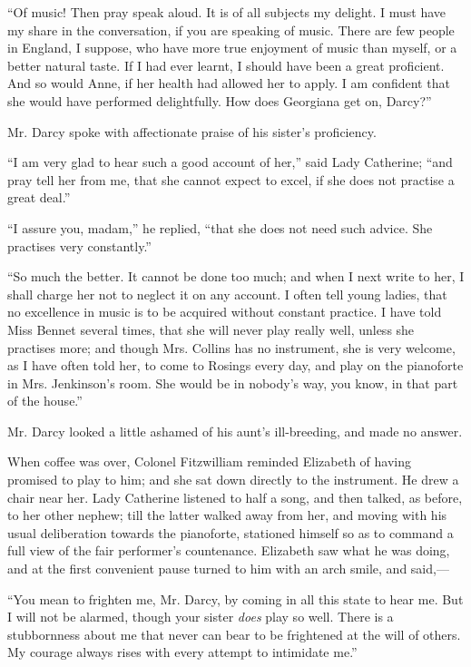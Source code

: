 \documentclass[12pt]{book}
\begin{document}
``Of music! Then pray speak aloud. It is of all subjects my delight. I must have my share in the conversation, if you are speaking of music. There are few people in England, I suppose, who have more true enjoyment of music than myself, or a better natural taste. If I had ever learnt, I should have been a great proficient. And so would Anne, if her health had allowed her to apply. I am confident that she would have performed delightfully. How does Georgiana get on, Darcy?''

Mr. Darcy spoke with affectionate praise of his sister's proficiency.

``I am very glad to hear such a good account of her,'' said Lady Catherine; ``and pray tell her from me, that she cannot expect to excel, if she does not practise a great deal.''

``I assure you, madam,'' he replied, ``that she does not need such advice. She practises very constantly.''

``So much the better. It cannot be done too much; and when I next write to her, I shall charge her not to neglect it on any account. I often tell young ladies, that no excellence in music is to be acquired without constant practice. I have told Miss Bennet several times, that she will never play really well, unless she practises more; and though Mrs. Collins has no instrument, she is very welcome, as I have often told her, to come to Rosings every day, and play on the pianoforte in Mrs. Jenkinson's room. She would be in nobody's way, you know, in that part of the house.''

Mr. Darcy looked a little ashamed of his aunt's ill-breeding, and made no answer.

When coffee was over, Colonel Fitzwilliam reminded Elizabeth of having promised to play to him; and she sat down directly to the instrument. He drew a chair near her. Lady Catherine listened to half a song, and then talked, as before, to her other nephew; till the latter walked away from her, and moving with his usual deliberation towards the pianoforte, stationed himself so as to command a full view of the fair performer's countenance. Elizabeth saw what he was doing, and at the first convenient pause turned to him with an arch smile, and said,---

``You mean to frighten me, Mr. Darcy, by coming in all this state to hear me. But I will not be alarmed, though your sister \textit{does} play so well. There is a stubbornness about me that never can bear to be frightened at the will of others. My courage always rises with every attempt to intimidate me.''
\end{document}
